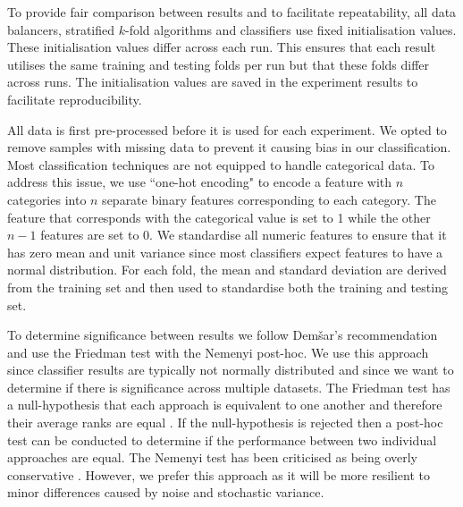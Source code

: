 \documentclass{sig-alternate-05-2015}
\begin{document}
	To provide fair comparison between results and to facilitate repeatability, all data balancers, stratified $k$-fold algorithms and classifiers use fixed initialisation values. These initialisation values differ across each run. This ensures that each result utilises the same training and testing folds per run but that these folds differ across runs. The initialisation values are saved in the experiment results to facilitate reproducibility.
	
	All data is first pre-processed before it is used for each experiment. We opted to remove samples with missing data to prevent it causing bias in our classification. Most classification techniques are not equipped to handle categorical data. To address this issue, we use ``one-hot encoding" to encode a feature with $n$ categories into $n$ separate binary features corresponding to each category. The feature that corresponds with the categorical value is set to 1 while the other $n-1$ features are set to 0. We standardise all numeric features to ensure that it has zero mean and unit variance since most classifiers expect features to have a normal distribution. For each fold, the mean and standard deviation are derived from the training set and then used to standardise both the training and testing set. 
	
	To determine significance between results we follow Dem\v{s}ar's \cite{Demsar:2006:SCC:1248547.1248548} recommendation and use the Friedman test with the Nemenyi post-hoc. We use this approach since classifier results are typically not normally distributed and since we want to determine if there is significance across multiple datasets. The Friedman test has a null-hypothesis that each approach is equivalent to one another and therefore their average ranks are equal \cite{Demsar:2006:SCC:1248547.1248548}. If the null-hypothesis is rejected then a post-hoc test can be conducted to determine if the performance between two individual approaches are equal. The Nemenyi test has been criticised as being overly conservative \cite{garcia2008extension}. However, we prefer this approach as it will be more resilient to minor differences caused by noise and stochastic variance.
	
\end{document}
